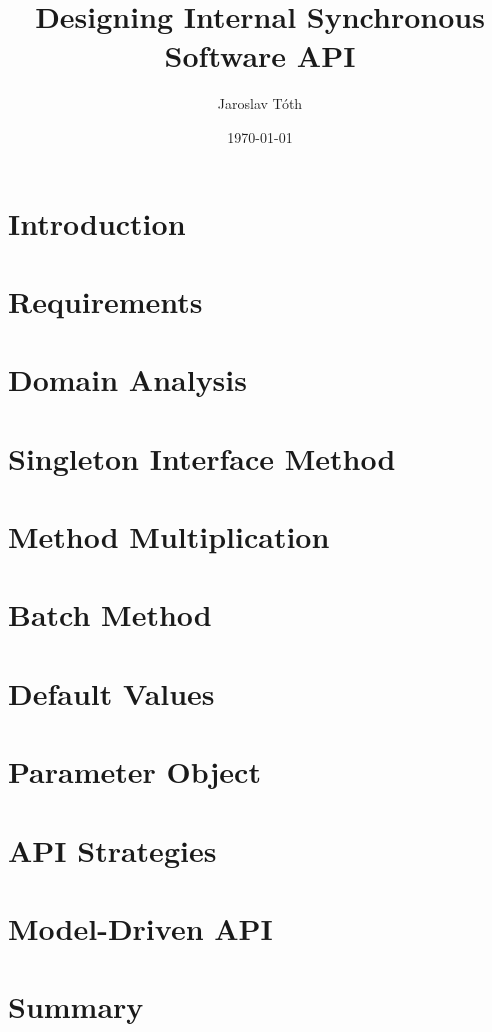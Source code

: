 \documentclass[11pt]{article}
\title{Designing Internal Synchronous Software API}
\author{Jaroslav Tóth}
\date{\today}
\begin{document}
\maketitle

\section{Introduction}
\label{sec:introduction}


\section{Requirements}
\label{sec:requirements}


\section{Domain Analysis}
\label{sec:domain}


\section{Singleton Interface Method}
\label{sec:singleton_interface_method}


\section{Method Multiplication}
\label{sec:method_multiplication}


\section{Batch Method}
\label{sec:batch_method}


\section{Default Values}
\label{sec:default_values}


\section{Parameter Object}
\label{sec:parameter_object}


\section{API Strategies}
\label{sec:api_strategies}


\section{Model-Driven API}
\label{sec:model_driven_api}


\section{Summary}
\label{sec:summary}




\end{document}
